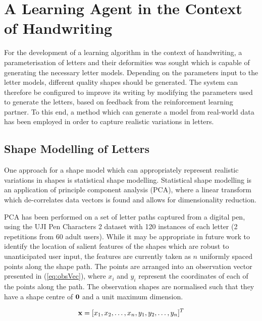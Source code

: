 \documentclass{sig-alternate}
\begin{document}
\section{A Learning Agent in the Context of Handwriting} \label{sec:learningAlgorithm}

For the development of a learning algorithm in the context of
handwriting, a parameterisation of letters and their deformities was sought
which is capable of generating the necessary letter models. Depending on the parameters input to
the letter models, different quality shapes should be generated. The system can
therefore be configured to improve its writing by modifying the parameters used
to generate the letters, based on feedback from the reinforcement learning
partner. To this end, a method which can generate a model from real-world data
has been employed in order to capture realistic variations in letters. 

\subsection{Shape Modelling of Letters} \label{sec:writingGeneration}

One approach for a shape model which can appropriately represent realistic
variations in shapes is statistical shape
modelling. Statistical shape modelling is an application of principle component
analysis (PCA), where a linear transform which de-correlates data vectors is
found \cite{Stegmann2002} and allows for dimensionality reduction. 

PCA has been performed on a set of letter paths captured from a digital pen,
using the UJI Pen Characters 2 dataset \cite{Llorens2008} with 120 instances of
each letter (2 repetitions from 60 adult users). While it may be appropriate in future work to
identify the location of salient features of the shapes which are robust to unanticipated user input,
the features are currently taken as $n$ uniformly spaced points along the shape
path. The
points are arranged into an observation vector presented in (\ref{eq:obsVec}),
where $x_i$ and $y_i$ represent the coordinates of each of the points along the
path. The observation shapes are normalised such that they have a shape
centre of ${\bf 0}$ and a unit maximum dimension.

\begin{equation}\label{eq:obsVec}
{\bf x} = [x_1, x_2, \ldots, x_n, y_1, y_2, \ldots, y_n]^T
\end{equation}
\end{document}
